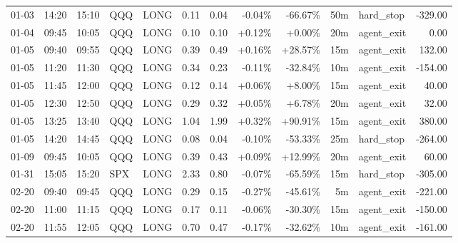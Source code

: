 \documentclass[11pt,a4paper]{article}
\begin{document}
\begin{center}
\begin{longtable}{>{\color{txtmain}}l l l l l r r r r r >{\color{txtmain}}l r}
01-03 & 14:20 & 15:10 & QQQ & LONG & 0.11 & 0.04 & \textcolor{lossred}{-0.04\%} & \textcolor{lossred}{-66.67\%} & 50m & hard\_stop & \textcolor{lossred}{-329.00} \\
01-04 & 09:45 & 10:05 & QQQ & LONG & 0.10 & 0.10 & \textcolor{wingreen}{+0.12\%} & \textcolor{wingreen}{+0.00\%} & 20m & agent\_exit & \textcolor{wingreen}{0.00} \\
01-05 & 09:40 & 09:55 & QQQ & LONG & 0.39 & 0.49 & \textcolor{wingreen}{+0.16\%} & \textcolor{wingreen}{+28.57\%} & 15m & agent\_exit & \textcolor{wingreen}{132.00} \\
01-05 & 11:20 & 11:30 & QQQ & LONG & 0.34 & 0.23 & \textcolor{lossred}{-0.11\%} & \textcolor{lossred}{-32.84\%} & 10m & agent\_exit & \textcolor{lossred}{-154.00} \\
01-05 & 11:45 & 12:00 & QQQ & LONG & 0.12 & 0.14 & \textcolor{wingreen}{+0.06\%} & \textcolor{wingreen}{+8.00\%} & 15m & agent\_exit & \textcolor{wingreen}{40.00} \\
01-05 & 12:30 & 12:50 & QQQ & LONG & 0.29 & 0.32 & \textcolor{wingreen}{+0.05\%} & \textcolor{wingreen}{+6.78\%} & 20m & agent\_exit & \textcolor{wingreen}{32.00} \\
01-05 & 13:25 & 13:40 & QQQ & LONG & 1.04 & 1.99 & \textcolor{wingreen}{+0.32\%} & \textcolor{wingreen}{+90.91\%} & 15m & agent\_exit & \textcolor{wingreen}{380.00} \\
01-05 & 14:20 & 14:45 & QQQ & LONG & 0.08 & 0.04 & \textcolor{lossred}{-0.10\%} & \textcolor{lossred}{-53.33\%} & 25m & hard\_stop & \textcolor{lossred}{-264.00} \\
01-09 & 09:45 & 10:05 & QQQ & LONG & 0.39 & 0.43 & \textcolor{wingreen}{+0.09\%} & \textcolor{wingreen}{+12.99\%} & 20m & agent\_exit & \textcolor{wingreen}{60.00} \\
01-31 & 15:05 & 15:20 & SPX & LONG & 2.33 & 0.80 & \textcolor{lossred}{-0.07\%} & \textcolor{lossred}{-65.59\%} & 15m & hard\_stop & \textcolor{lossred}{-305.00} \\
02-20 & 09:40 & 09:45 & QQQ & LONG & 0.29 & 0.15 & \textcolor{lossred}{-0.27\%} & \textcolor{lossred}{-45.61\%} & 5m & agent\_exit & \textcolor{lossred}{-221.00} \\
02-20 & 11:00 & 11:15 & QQQ & LONG & 0.17 & 0.11 & \textcolor{lossred}{-0.06\%} & \textcolor{lossred}{-30.30\%} & 15m & agent\_exit & \textcolor{lossred}{-150.00} \\
02-20 & 11:55 & 12:05 & QQQ & LONG & 0.70 & 0.47 & \textcolor{lossred}{-0.17\%} & \textcolor{lossred}{-32.62\%} & 10m & agent\_exit & \textcolor{lossred}{-161.00} \\

\end{longtable}
\end{center}
\end{document}
